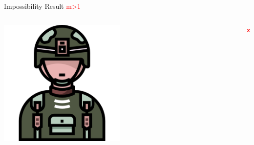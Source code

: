 \documentclass{beamer}
\begin{document}
\begin{frame}{Impossibility Result \textcolor{red}{m>1}}
\vspace{0.5cm} %

\begin{columns}[c] %
    \begin{column}{0.3\textwidth} %
        \includegraphics[width=0.5\textwidth]{images2/soldier (1).png} %
    \end{column}
    \begin{column}{0.7\textwidth} %
        \textbf{\textcolor{red}{z}}
    \end{column}
\end{columns}

\end{frame}
\end{document}
